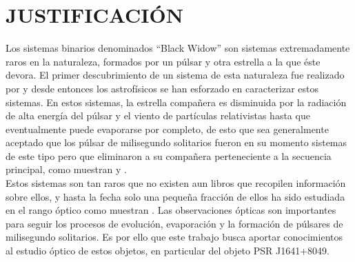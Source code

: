 \chapter{JUSTIFICACIÓN}

Los sistemas binarios  denominados ``Black Widow'' son sistemas extremadamente raros en la naturaleza, formados por un p\'ulsar y otra estrella a la que \'este devora. El primer descubrimiento de un sistema de esta naturaleza fue realizado por \citet{fruchter1988} y desde entonces los astrofísicos se han esforzado en caracterizar estos sistemas. En estos sistemas, la estrella compañera es disminuida por la radiación de alta energía del púlsar y el viento de partículas relativistas hasta que eventualmente puede evaporarse por completo, de esto que sea generalmente aceptado que los p\'ulsar de milisegundo solitarios fueron en su momento sistemas de este tipo pero que eliminaron a su compa\~nera perteneciente a la secuencia principal, como muestran \citet{1974Bisnovatyi} y \citet{1982New-class-MSP-Alpar}. \\



Estos sistemas son tan raros que no existen aun libros que recopilen información sobre ellos, y hasta la fecha solo una peque\~na fracción de ellos ha sido estudiada en el rango óptico como muestran \citet{Zharikov2019}. Las observaciones ópticas son importantes para seguir los procesos de evolución, evaporación y la formación de p\'ulsares de milisegundo solitarios. Es por ello que este trabajo busca aportar conocimientos al estudio óptico de estos objetos, en particular del objeto PSR J1641+8049.  


